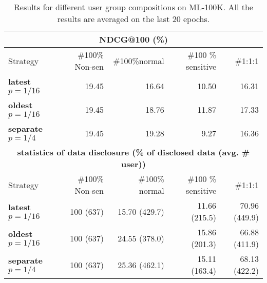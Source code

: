 

\begin{table}
    \renewcommand{\arraystretch}{1.2}
    \centering
    \caption{%
    Results for different user group compositions on ML-100K. All the results are averaged on the last 20 epochs.
    }%
    \label{tab:user_composition}
    \begin{adjustbox}{max width=\linewidth}
    \begin{tabular}{l rrrr}
\toprule
\multicolumn{5}{c}{ \textbf{NDCG@100 (\%)}} \\ \toprule
Strategy & \#100\% Non-sen & \#100\%normal &  \#100 \% sensitive  &  \#1:1:1  \\ 
\midrule
\textbf{latest $p=1/16$} &  19.45 & 16.64  &   10.50  & 16.31    \\ 
\textbf{oldest $p=1/16$} &   19.45 &  18.76   &  11.87  & 17.33  \\
\textbf{separate $p=1/4$} &   19.45  & 19.28 & 9.27   &  16.36   \\
\bottomrule %
\multicolumn{5}{c}{\textbf{statistics of data disclosure (\% of disclosed data (avg. \# user))}} \\ \toprule
Strategy & \#100\% Non-sen & \#100\% normal &  \#100 \% sensitive  &  \#1:1:1  \\ 
\midrule
\textbf{latest $p=1/16$} & 100 (637)&  15.70 (429.7)&   11.66  (215.5) &  70.96 (449.9)    \\ 
\textbf{oldest $p=1/16$} &   100 (637) &  24.55 (378.0)   &  15.86 (201.3)  & 66.88 (411.9)    \\
\textbf{separate $p=1/4$} & 100 (637) & 25.36 (462.1) &  15.11 (163.4)  &  68.13 (422.2)  \\

\bottomrule
\end{tabular}
\end{adjustbox}
\end{table}